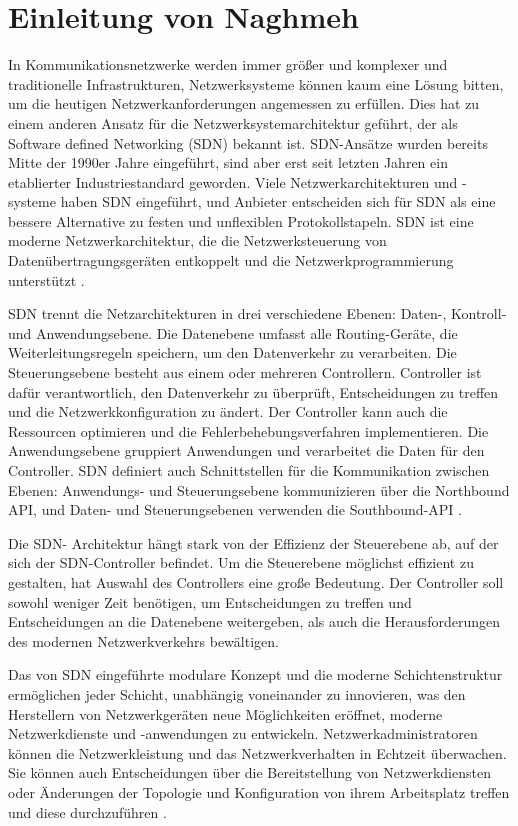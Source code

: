 \documentclass[fontsize=12pt,paper=a4,open=any,parskip=half,
  twoside=false,toc=listof,toc=bibliography,fleqn,leqno,
  captions=nooneline,captions=tableabove,british]{scrbook}
\begin{document}
\newpage
\section*{Einleitung von Naghmeh}\label{einl-naghmeh}
In Kommunikationsnetzwerke werden immer größer und komplexer und traditionelle Infrastrukturen, Netzwerksysteme können kaum eine Lösung bitten, um die heutigen Netzwerkanforderungen angemessen zu erfüllen. Dies hat zu einem anderen Ansatz für die Netzwerksystemarchitektur geführt, der als Software defined Networking (SDN) bekannt ist. SDN-Ansätze wurden bereits Mitte der 1990er Jahre eingeführt, sind aber erst seit letzten Jahren ein etablierter Industriestandard geworden. Viele Netzwerkarchitekturen und -systeme haben SDN eingeführt, und Anbieter entscheiden sich für SDN als eine bessere Alternative zu festen und unflexiblen Protokollstapeln. SDN ist eine moderne Netzwerkarchitektur, die die Netzwerksteuerung von Datenübertragungsgeräten entkoppelt und die Netzwerkprogrammierung unterstützt \cite{gelberger2013performance}.\par
SDN trennt die Netzarchitekturen in drei verschiedene Ebenen: Daten-, Kontroll- und Anwendungsebene. Die Datenebene umfasst alle Routing-Geräte, die Weiterleitungsregeln speichern, um den Datenverkehr zu verarbeiten. Die Steuerungsebene besteht aus einem oder mehreren Controllern. Controller ist dafür verantwortlich, den Datenverkehr zu überprüft, Entscheidungen zu treffen und die Netzwerkkonfiguration zu ändert. Der Controller kann auch die Ressourcen optimieren und die Fehlerbehebungsverfahren implementieren. Die Anwendungsebene gruppiert Anwendungen und verarbeitet die Daten für den Controller. SDN definiert auch Schnittstellen für die Kommunikation zwischen Ebenen: Anwendungs- und Steuerungsebene kommunizieren über die Northbound API, und Daten- und Steuerungsebenen verwenden die Southbound-API \cite{rastogi2016comparative}.\par
Die SDN- Architektur hängt stark von der Effizienz der Steuerebene ab, auf der sich der SDN-Controller befindet. Um die Steuerebene möglichst effizient zu gestalten, hat Auswahl des Controllers eine große Bedeutung. Der Controller soll  sowohl weniger Zeit benötigen, um Entscheidungen zu treffen und Entscheidungen an die Datenebene weitergeben, als auch die Herausforderungen des modernen Netzwerkverkehrs bewältigen\cite{rastogi2016comparative}.\par
Das von SDN eingeführte modulare Konzept und die moderne Schichtenstruktur ermöglichen jeder Schicht, unabhängig voneinander zu innovieren, was den Herstellern von Netzwerkgeräten neue Möglichkeiten eröffnet, moderne Netzwerkdienste und -anwendungen zu entwickeln. Netzwerkadministratoren können die Netzwerkleistung und das Netzwerkverhalten in Echtzeit überwachen. Sie können auch Entscheidungen über die Bereitstellung von Netzwerkdiensten oder Änderungen der Topologie und Konfiguration von ihrem Arbeitsplatz treffen und diese durchzuführen \cite{hasan2020sdn}.\par
\end{document}
